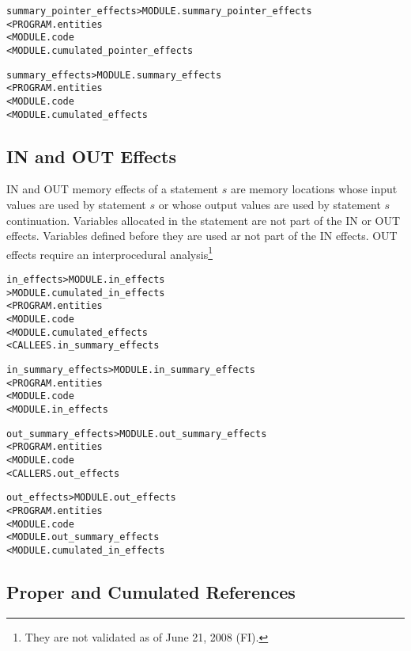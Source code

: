 \documentclass[a4paper]{report}
\newenvironment{PipsMake}{\begin{alltt}}{\end{alltt}}
\begin{document}
\begin{PipsMake}
summary_pointer_effects                 > MODULE.summary_pointer_effects
        < PROGRAM.entities
        < MODULE.code
        < MODULE.cumulated_pointer_effects
\end{PipsMake}

\begin{PipsMake}
summary_effects                 > MODULE.summary_effects
        < PROGRAM.entities
        < MODULE.code
        < MODULE.cumulated_effects
\end{PipsMake}


\subsection{IN and OUT Effects}
\label{subsubsection-in-and-out-effects}

IN and OUT memory effects of a statement $s$ are memory locations
whose input values are used by statement $s$ or whose output values
are used by statement $s$ continuation. Variables allocated in the
statement are not part of the IN or OUT effects. Variables defined
before they are used ar not part of the IN effects. OUT effects
require an interprocedural analysis\footnote{They are not validated as
of June 21, 2008 (FI).}

\begin{PipsMake}
in_effects > MODULE.in_effects
           > MODULE.cumulated_in_effects
         < PROGRAM.entities
         < MODULE.code
         < MODULE.cumulated_effects
         < CALLEES.in_summary_effects

in_summary_effects > MODULE.in_summary_effects
        < PROGRAM.entities
        < MODULE.code
        < MODULE.in_effects

out_summary_effects > MODULE.out_summary_effects
        < PROGRAM.entities
        < MODULE.code
        < CALLERS.out_effects

out_effects > MODULE.out_effects
        < PROGRAM.entities
        < MODULE.code
        < MODULE.out_summary_effects
        < MODULE.cumulated_in_effects
\end{PipsMake}

\subsection{Proper and Cumulated References}
\end{document}
